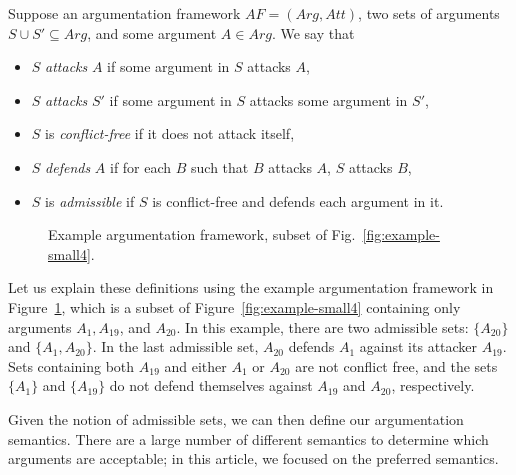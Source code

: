 \begin{definition} Suppose an argumentation framework $AF=(Arg,Att)$, two sets of arguments $S\cup S'\subseteq Arg$, and some argument $A\in Arg$. We say that
\begin{itemize}
\item $S$ \emph{attacks} $A$ if some argument in $S$ attacks $A$,
\item $S$ \emph{attacks} $S'$ if some argument in $S$ attacks some argument in $S'$,
\item $S$ is \emph{conflict-free} if it does not attack itself,
\item $S$ \emph{defends} $A$ if for each $B$ such that $B$ attacks $A$, $S$ attacks $B$,
\item $S$ is \emph{admissible} if $S$ is conflict-free and defends each argument in it.
\end{itemize}
\end{definition}

\begin{figure}[ht!]
\centering
{}
\caption{Example argumentation framework, subset of Fig.~\ref{fig:example-small4}.}
\label{fig:goalmodeling:arg2}
\end{figure}

Let us explain these definitions using the example argumentation framework in Figure~\ref{fig:goalmodeling:arg2}, which is a subset of Figure~\ref{fig:example-small4} containing only arguments $A_1, A_{19}$, and $A_{20}$. In this example, there are two admissible sets: $\{A_{20}\}$ and $\{A_1, A_{20}\}$. In the last admissible set, $A_{20}$ defends $A_1$ against its attacker $A_{19}$. Sets containing both $A_{19}$ and either $A_1$ or $A_{20}$ are not conflict free, and the sets $\{A_1\}$ and $\{A_{19}\}$ do not defend themselves against $A_{19}$ and $A_{20}$, respectively. 

Given the notion of admissible sets, we can then define our argumentation semantics. There are a large number of different semantics to determine which arguments are acceptable; in this article, we focused on the preferred semantics.

